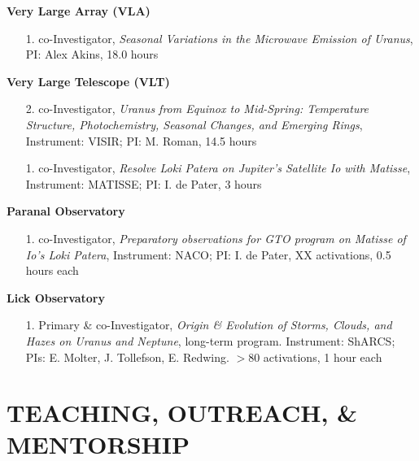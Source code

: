 \documentclass[margin, 10pt]{res} %
\begin{document}
\begin{resume}
\begin{enumerate}
\end{enumerate}
\vspace{-0.3cm}
\textbf{Very Large Array (VLA)}
\begin{enumerate}
	\item[1.] co-Investigator, {\it Seasonal Variations in the Microwave Emission of Uranus}, PI: Alex Akins, 18.0 hours %
\end{enumerate}
\vspace{-0.3cm}
\textbf{Very Large Telescope (VLT)} 
\begin{enumerate}
	\item[2.] co-Investigator, {\it Uranus from Equinox to Mid-Spring: Temperature Structure, Photochemistry, Seasonal Changes, and Emerging Rings}, Instrument: VISIR; PI: M. Roman, 14.5 hours %
	\item[1.] co-Investigator, {\it Resolve Loki Patera on Jupiter’s Satellite Io with Matisse}, Instrument: MATISSE; PI: I. de Pater, 3 hours %
\end{enumerate}
\vspace{-0.3cm}
\textbf{Paranal Observatory}
\begin{enumerate}
	\item[1.] co-Investigator, {\it Preparatory observations for GTO program on Matisse of Io's Loki Patera}, Instrument: NACO; PI: I. de Pater, XX activations, 0.5 hours each %
\end{enumerate}
\vspace{-0.3cm}
\textbf{Lick Observatory} 
\begin{enumerate}
	\item[1.] Primary \& co-Investigator, {\it Origin \& Evolution of Storms, Clouds, and Hazes on Uranus and Neptune}, long-term program. Instrument: ShARCS; PIs: E. Molter, J. Tollefson, E. Redwing. $>$80 activations, 1 hour each %
\end{enumerate}


\section{TEACHING, OUTREACH, \& MENTORSHIP}


\end{resume}
\end{document}
